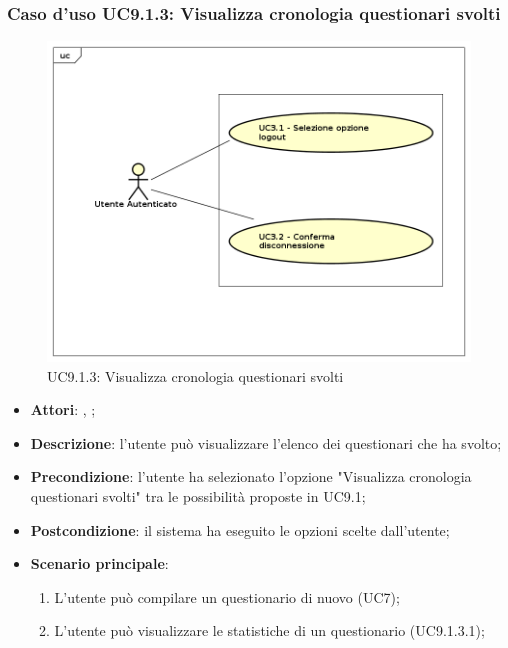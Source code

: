 		\subsubsection{Caso d'uso UC9.1.3: Visualizza cronologia questionari svolti}
		\label{UC9.1.3}
		\begin{figure}[h]
			\centering
			\includegraphics[scale=0.5,keepaspectratio]{UML/UC9.png}
			\caption{UC9.1.3: Visualizza cronologia questionari svolti}
		\end{figure}
		\FloatBarrier
		\begin{itemize}
			\item \textbf{Attori}: \uau, \uaupro;
			\item \textbf{Descrizione}: l'utente può visualizzare l'elenco dei questionari che ha svolto;
			\item \textbf{Precondizione}: l'utente ha selezionato l'opzione "Visualizza cronologia questionari svolti" tra le possibilità proposte in UC9.1;
			\item \textbf{Postcondizione}: il sistema ha eseguito le opzioni scelte dall'utente;
			\item \textbf{Scenario principale}: 
			\begin{enumerate}
				\item L'utente può compilare un questionario di nuovo (UC7);
				\item L'utente può visualizzare le statistiche di un questionario (UC9.1.3.1);
			\end{enumerate}
		\end{itemize}
		
